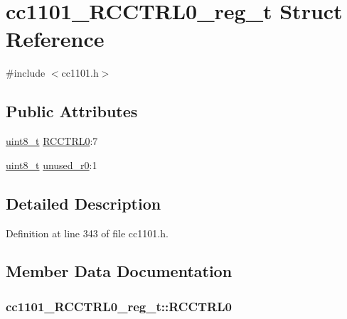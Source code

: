 \hypertarget{structcc1101___r_c_c_t_r_l0__reg__t}{}\section{cc1101\+\_\+\+R\+C\+C\+T\+R\+L0\+\_\+reg\+\_\+t Struct Reference}
\label{structcc1101___r_c_c_t_r_l0__reg__t}


{\ttfamily \#include $<$cc1101.\+h$>$}

\subsection*{Public Attributes}
\begin{DoxyCompactItemize}
\item 
\hyperlink{_p_e___types_8h_aba7bc1797add20fe3efdf37ced1182c5}{uint8\+\_\+t} \hyperlink{structcc1101___r_c_c_t_r_l0__reg__t_ac76eeb6c463a11d7ec74704620b3de09}{R\+C\+C\+T\+R\+L0}\+:7
\item 
\hyperlink{_p_e___types_8h_aba7bc1797add20fe3efdf37ced1182c5}{uint8\+\_\+t} \hyperlink{structcc1101___r_c_c_t_r_l0__reg__t_aa3b909faf53690329676247d4dac2879}{unused\+\_\+r0}\+:1
\end{DoxyCompactItemize}


\subsection{Detailed Description}


Definition at line 343 of file cc1101.\+h.



\subsection{Member Data Documentation}
\subsubsection[{\texorpdfstring{R\+C\+C\+T\+R\+L0}{RCCTRL0}}]{ cc1101\+\_\+\+R\+C\+C\+T\+R\+L0\+\_\+reg\+\_\+t\+::\+R\+C\+C\+T\+R\+L0}\hypertarget{structcc1101___r_c_c_t_r_l0__reg__t_ac76eeb6c463a11d7ec74704620b3de09}{}\label{structcc1101___r_c_c_t_r_l0__reg__t_ac76eeb6c463a11d7ec74704620b3de09}


